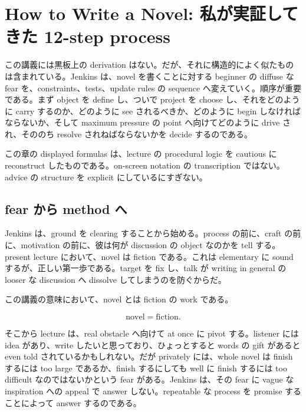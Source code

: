 \chapter{How to Write a Novel: 私が実証してきた 12-step process}

この講義には黒板上の derivation はない。だが、それに構造的によく似たものは含まれている。Jenkins は、novel を書くことに対する beginner の diffuse な fear を、constraints、tests、update rules の sequence へ変えていく。順序が重要である。まず object を define し、ついで project を choose し、それをどのように carry するのか、どのように see されるべきか、どのように begin しなければならないか、そして maximum pressure の point へ向けてどのように drive され、そののち resolve されねばならないかを decide するのである。

\begin{remark}
この章の displayed formulas は、lecture の procedural logic を cautious に reconstruct したものである。on-screen notation の transcription ではない。advice の structure を explicit にしているにすぎない。
\end{remark}

\section{fear から method へ}

Jenkins は、ground を clearing することから始める。process の前に、craft の前に、motivation の前に、彼は何が discussion の object なのかを tell する。present lecture において、novel は fiction である。これは elementary に sound するが、正しい第一歩である。target を fix し、talk が writing in general の looser な discussion へ dissolve してしまうのを防ぐからだ。

\begin{definition}
この講義の意味において、novel とは fiction の work である。
\end{definition}

\begin{equation}
\text{novel}=\text{fiction}.
\end{equation}

そこから lecture は、real obstacle へ向けて at once に pivot する。listener には idea があり、write したいと思っており、ひょっとすると words の gift があると even told されているかもしれない。だが privately には、whole novel は finish するには too large であるか、finish するにしても well に finish するには too difficult なのではないかという fear がある。Jenkins は、その fear に vague な inspiration への appeal で answer しない。repeatable な process を promise することによって answer するのである。

